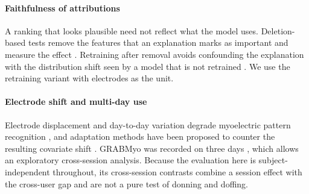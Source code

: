 \paragraph{Faithfulness of attributions}
A ranking that looks plausible need not reflect what the model uses. Deletion-based tests remove the features that an explanation marks as important and measure the effect \citep{samek2017evaluating}. Retraining after removal avoids confounding the explanation with the distribution shift seen by a model that is not retrained \citep{hooker2019benchmark}. We use the retraining variant with electrodes as the unit.

\paragraph{Electrode shift and multi-day use}
Electrode displacement and day-to-day variation degrade myoelectric pattern recognition \citep{hargrove2006effect,kaufmann2010fluctuating}, and adaptation methods have been proposed to counter the resulting covariate shift \citep{vidovic2016improving,muceli2014extracting}. GRABMyo was recorded on three days \citep{pradhan2022multiday}, which allows an exploratory cross-session analysis. Because the evaluation here is subject-independent throughout, its cross-session contrasts combine a session effect with the cross-user gap and are not a pure test of donning and doffing.

